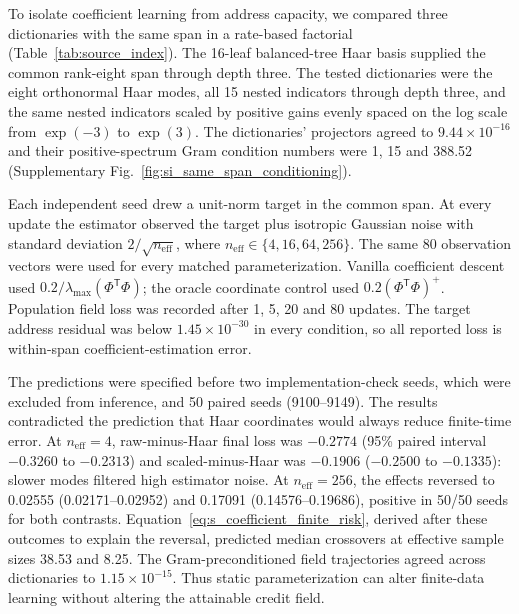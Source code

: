 To isolate coefficient learning from address capacity, we compared three
dictionaries with the same span in a rate-based factorial
(Table~\ref{tab:source_index}). The 16-leaf balanced-tree Haar basis supplied the common
rank-eight span through depth three. The tested dictionaries were the eight
orthonormal Haar modes, all 15 nested indicators through depth three, and the
same nested indicators scaled by positive gains evenly spaced on the log scale
from $\exp(-3)$ to $\exp(3)$. The dictionaries' projectors agreed to
$9.44\times10^{-16}$ and their positive-spectrum Gram condition numbers were
1, 15 and 388.52 (Supplementary Fig.~\ref{fig:si_same_span_conditioning}).

Each independent seed drew a unit-norm target in the common span. At every
update the estimator observed the target plus isotropic Gaussian noise with
standard deviation $2/\sqrt{n_{\mathrm{eff}}}$, where
$n_{\mathrm{eff}}\in\{4,16,64,256\}$. The same 80 observation vectors were
used for every matched parameterization. Vanilla coefficient descent used
$0.2/\lambda_{\max}(\Phi^{\mathsf T}\Phi)$; the oracle coordinate control used
$0.2(\Phi^{\mathsf T}\Phi)^+$. Population field loss was recorded after 1, 5, 20
and 80 updates. The target address residual was below
$1.45\times10^{-30}$ in every condition, so all reported loss is within-span
coefficient-estimation error.

The predictions were specified before two implementation-check seeds, which
were excluded from inference, and 50 paired seeds (9100--9149). The results contradicted the prediction that Haar coordinates would
always reduce finite-time error. At $n_{\mathrm{eff}}=4$, raw-minus-Haar
final loss was $-0.2774$ (95\% paired interval $-0.3260$ to $-0.2313$) and
scaled-minus-Haar was $-0.1906$ ($-0.2500$ to $-0.1335$): slower modes
filtered high estimator noise. At $n_{\mathrm{eff}}=256$, the effects reversed
to 0.02555 (0.02171--0.02952) and 0.17091 (0.14576--0.19686), positive in
50/50 seeds for both contrasts. Equation~\ref{eq:s_coefficient_finite_risk},
derived after these outcomes to explain the reversal, predicted median
crossovers at effective
sample sizes 38.53 and 8.25. The Gram-preconditioned field trajectories agreed
across dictionaries to $1.15\times10^{-15}$. Thus static parameterization can
alter finite-data learning without altering the attainable credit field.
